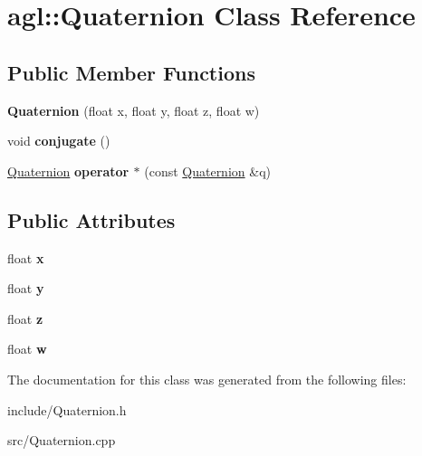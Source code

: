 \hypertarget{classagl_1_1Quaternion}{}\section{agl\+::Quaternion Class Reference}
\label{classagl_1_1Quaternion}
\subsection*{Public Member Functions}
\begin{DoxyCompactItemize}
\item 
\mbox{\label{classagl_1_1Quaternion_a870288e37d81ca2798db0054432fa6ee}} 
{\bfseries Quaternion} (float x, float y, float z, float w)
\item 
\mbox{\label{classagl_1_1Quaternion_aee9c02004ac55a75b35f017e7820a59e}} 
void {\bfseries conjugate} ()
\item 
\mbox{\label{classagl_1_1Quaternion_a4d1ca348d54024d53acdee065c914a84}} 
\mbox{\hyperlink{classagl_1_1Quaternion}{Quaternion}} {\bfseries operator $\ast$} (const \mbox{\hyperlink{classagl_1_1Quaternion}{Quaternion}} \&q)
\end{DoxyCompactItemize}
\subsection*{Public Attributes}
\begin{DoxyCompactItemize}
\item 
\mbox{\label{classagl_1_1Quaternion_a28ed454f7088c55a6b636e28ad27db67}} 
float {\bfseries x}
\item 
\mbox{\label{classagl_1_1Quaternion_ab4285a6d9687ca5d864534488799ac76}} 
float {\bfseries y}
\item 
\mbox{\label{classagl_1_1Quaternion_a126ebcab8d6966a13eb918728a4b9cbe}} 
float {\bfseries z}
\item 
\mbox{\label{classagl_1_1Quaternion_a0cd227abbafca02e50ff2e7d1925df95}} 
float {\bfseries w}
\end{DoxyCompactItemize}


The documentation for this class was generated from the following files\+:\begin{DoxyCompactItemize}
\item 
include/Quaternion.\+h\item 
src/Quaternion.\+cpp\end{DoxyCompactItemize}
